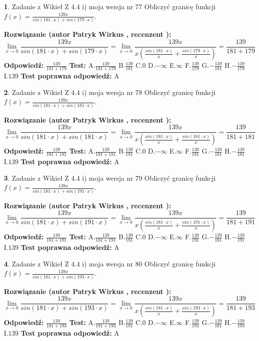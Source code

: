\documentclass[12pt, a4paper]{article}
\theoremstyle{definition} %
\newtheorem{zad}{}
\newcommand{\zadStart}[1]{\begin{zad}#1\newline}
\newcommand{\zadStop}{\end{zad}}
\newcommand{\rozwStart}[2]{\noindent \textbf{Rozwiązanie (autor #1 , recenzent #2): }\newline}
\newcommand{\rozwStop}{\newline}
\newcommand{\odpStart}{\noindent \textbf{Odpowiedź:}\newline}
\newcommand{\odpStop}{\newline}
\newcommand{\testStart}{\noindent \textbf{Test:}\newline}
\newcommand{\testStop}{\newline}
\newcommand{\kluczStart}{\noindent \textbf{Test poprawna odpowiedź:}\newline}
\newcommand{\kluczStop}{\newline}
\begin{document}
\zadStart{Zadanie z Wikieł Z 4.4 i) moja wersja nr 77}
Obliczyć granicę funkcji $f(x)=\frac{139x}{sin(181\cdot x) +sin(179\cdot x)}$.
\zadStop
\rozwStart{Patryk Wirkus}{}
$$\lim\limits_{x\to 0}\frac{139x}{sin(181\cdot x) +sin(179\cdot x)}=\lim\limits_{x\to 0}\frac{139x}{x(\frac{sin(181\cdot x)}{x}+\frac{sin(179\cdot x)}{x})}=\frac{139}{181+179}$$
\rozwStop
\odpStart
$\frac{139}{181+179}$
\odpStop
\testStart
A.$\frac{139}{181+179}$
B.$\frac{139}{181}$
C.$0$
D.$-\infty$
E.$\infty$
F.$\frac{139}{179}$
G.$-\frac{139}{181}$
H.$-\frac{139}{179}$
I.$139$
\testStop
\kluczStart
A
\kluczStop



\zadStart{Zadanie z Wikieł Z 4.4 i) moja wersja nr 78}
Obliczyć granicę funkcji $f(x)=\frac{139x}{sin(181\cdot x) +sin(181\cdot x)}$.
\zadStop
\rozwStart{Patryk Wirkus}{}
$$\lim\limits_{x\to 0}\frac{139x}{sin(181\cdot x) +sin(181\cdot x)}=\lim\limits_{x\to 0}\frac{139x}{x(\frac{sin(181\cdot x)}{x}+\frac{sin(181\cdot x)}{x})}=\frac{139}{181+181}$$
\rozwStop
\odpStart
$\frac{139}{181+181}$
\odpStop
\testStart
A.$\frac{139}{181+181}$
B.$\frac{139}{181}$
C.$0$
D.$-\infty$
E.$\infty$
F.$\frac{139}{181}$
G.$-\frac{139}{181}$
H.$-\frac{139}{181}$
I.$139$
\testStop
\kluczStart
A
\kluczStop



\zadStart{Zadanie z Wikieł Z 4.4 i) moja wersja nr 79}
Obliczyć granicę funkcji $f(x)=\frac{139x}{sin(181\cdot x) +sin(191\cdot x)}$.
\zadStop
\rozwStart{Patryk Wirkus}{}
$$\lim\limits_{x\to 0}\frac{139x}{sin(181\cdot x) +sin(191\cdot x)}=\lim\limits_{x\to 0}\frac{139x}{x(\frac{sin(181\cdot x)}{x}+\frac{sin(191\cdot x)}{x})}=\frac{139}{181+191}$$
\rozwStop
\odpStart
$\frac{139}{181+191}$
\odpStop
\testStart
A.$\frac{139}{181+191}$
B.$\frac{139}{181}$
C.$0$
D.$-\infty$
E.$\infty$
F.$\frac{139}{191}$
G.$-\frac{139}{181}$
H.$-\frac{139}{191}$
I.$139$
\testStop
\kluczStart
A
\kluczStop



\zadStart{Zadanie z Wikieł Z 4.4 i) moja wersja nr 80}
Obliczyć granicę funkcji $f(x)=\frac{139x}{sin(181\cdot x) +sin(193\cdot x)}$.
\zadStop
\rozwStart{Patryk Wirkus}{}
$$\lim\limits_{x\to 0}\frac{139x}{sin(181\cdot x) +sin(193\cdot x)}=\lim\limits_{x\to 0}\frac{139x}{x(\frac{sin(181\cdot x)}{x}+\frac{sin(193\cdot x)}{x})}=\frac{139}{181+193}$$
\rozwStop
\odpStart
$\frac{139}{181+193}$
\odpStop
\testStart
A.$\frac{139}{181+193}$
B.$\frac{139}{181}$
C.$0$
D.$-\infty$
E.$\infty$
F.$\frac{139}{193}$
G.$-\frac{139}{181}$
H.$-\frac{139}{193}$
I.$139$
\testStop
\kluczStart
A
\kluczStop
\end{document}
